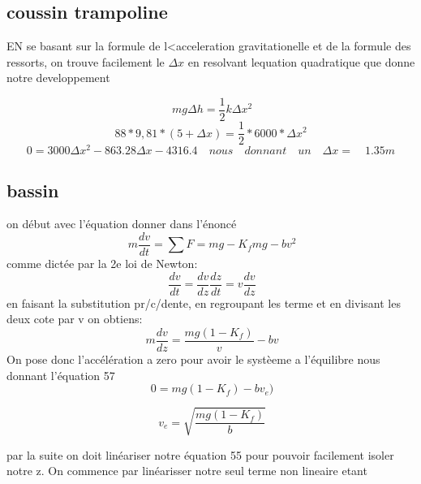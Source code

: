 \documentclass{article}
\begin{document}
 
 \subsection{coussin trampoline}
 
 EN se basant sur la formule de l<acceleration gravitationelle et de la formule des ressorts, on trouve facilement le $\Delta x$ en resolvant lequation quadratique que donne notre developpement
 
 \begin{equation}
\ mg \Delta h = \frac{1}{2}k \Delta x ^2
 \end{equation}
 \begin{equation}
 88*9,81*(5+\Delta x) = \frac{1}{2}*6000*\Delta x^2 
 \end{equation}
 \begin{equation}
 0 = 3000\Delta x^2 - 863.28 \Delta x - 4316.4 \quad nous\quad  donnant\quad  un\quad  \Delta x=\quad 1.35m 
 \end{equation}

\subsection{bassin}

on début avec l'équation donner dans l'énoncé
\begin{equation}
\ m \frac{dv}{dt} = \sum F = mg - K_{f}mg - bv^2
\end{equation}
comme dictée par la 2e loi de Newton:
\begin{equation}
\ \frac{dv}{dt} = \frac{dv}{dz} \frac{dz}{dt} = v\frac{dv}{dz}
\end{equation}
en faisant la substitution pr/c/dente, en regroupant les terme et en divisant les deux cote par v on obtiens:
\begin{equation}
\ m\frac{dv}{dz} =  \frac{mg ( 1- K_{f})}{v} - bv
\end{equation}
On pose donc l'accélération a zero pour avoir le systèeme a l'équilibre nous donnant l'équation 57
\begin{equation}
\ 0 =  mg ( 1- K_{f}) - bv_{e})
\end{equation}

\begin{equation}
\ v_{e} = \sqrt{\frac{mg(1-K_{f})}{b}}
\end{equation}

par la suite on doit linéariser notre équation 55 pour pouvoir facilement isoler notre z. On commence par linéarisser notre seul terme non lineaire etant 
\end{document}
